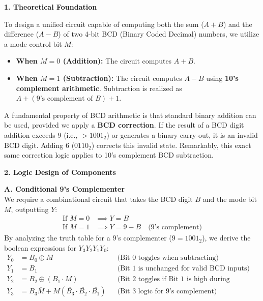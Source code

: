 \documentclass[12pt,a3paper]{article}
\begin{document}
\begin{enumerate}
\begin{tcolorbox}[enhanced,breakable,ansbox,colback=cD!4,colframe=cD,boxrule=0.8pt,arc=5pt,title={\textbf{Answer}},fonttitle=\bfseries\color{white},colbacktitle=cD]
\textbf{\textcolor{cD}{1. Theoretical Foundation}}

To design a unified circuit capable of computing both the sum ($A + B$) and the difference ($A - B$) of two 4-bit BCD (Binary Coded Decimal) numbers, we utilize a mode control bit \textbf{$M$}:
\begin{itemize}
    \item \textbf{When $M = 0$ (Addition):} The circuit computes $A + B$.
    \item \textbf{When $M = 1$ (Subtraction):} The circuit computes $A - B$ using \textbf{10's complement arithmetic}. Subtraction is realized as $A + (\text{9's complement of } B) + 1$.
\end{itemize}

A fundamental property of BCD arithmetic is that standard binary addition can be used, provided we apply a \textbf{BCD correction}. If the result of a BCD digit addition exceeds $9$ (i.e., $> 1001_2$) or generates a binary carry-out, it is an invalid BCD digit. Adding $6$ ($0110_2$) corrects this invalid state. Remarkably, this exact same correction logic applies to 10's complement BCD subtraction.

\vspace{1em}
\textbf{\textcolor{cD}{2. Logic Design of Components}}

\textbf{A. Conditional 9's Complementer} \\
We require a combinational circuit that takes the BCD digit $B$ and the mode bit $M$, outputting $Y$:
\begin{align*}
    \text{If } M = 0 &\implies Y = B \\
    \text{If } M = 1 &\implies Y = 9 - B \quad \text{(9's complement)}
\end{align*}
By analyzing the truth table for a 9's complementer ($9 = 1001_2$), we derive the boolean expressions for $Y_3 Y_2 Y_1 Y_0$:
\begin{align*}
    Y_0 &= B_0 \oplus M && \text{(Bit 0 toggles when subtracting)} \\
    Y_1 &= B_1 && \text{(Bit 1 is unchanged for valid BCD inputs)} \\
    Y_2 &= B_2 \oplus (B_1 \cdot M) && \text{(Bit 2 toggles if Bit 1 is high during subtraction)} \\
    Y_3 &= B_3\overline{M} + M(\overline{B_3} \cdot \overline{B_2} \cdot \overline{B_1}) && \text{(Bit 3 logic for 9's complement)}
\end{align*}


\end{tcolorbox}
\end{enumerate}
\end{document}
